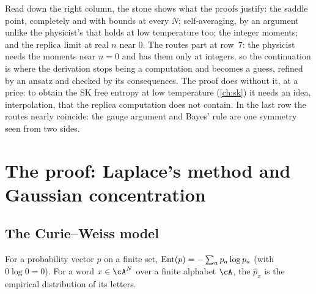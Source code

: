 \begin{refsection}
Read down the right column, the stone shows what the proofs justify: the saddle point, completely and with bounds at every $N$; self-averaging, by an argument unlike the physicist's that holds at low temperature too; the integer moments; and the replica limit at real $n$ near $0$. The routes part at row~7: the physicist needs the moments near $n=0$ and has them only at integers, so the continuation is where the derivation stops being a computation and becomes a guess, refined by an ansatz and checked by its consequences. The proof does without it, at a price: to obtain the SK free entropy at low temperature (\cref{ch:sk}) it needs an idea, interpolation, that the replica computation does not contain. In the last row the routes nearly coincide: the gauge argument and Bayes' rule are one symmetry seen from two sides.

\section{The proof: Laplace's method and Gaussian concentration}\label{sec:freeentropy:laplace}

\subsection{The Curie--Weiss model}

For a probability vector $p$ on a finite set, $\operatorname{Ent}(p)=-\sum_ap_a\log p_a$ (with $0\log0=0$). For a word $x\in\cA^N$ over a finite alphabet $\cA$, the  $\hat p_x$ is the empirical distribution of its letters.



\end{refsection}
